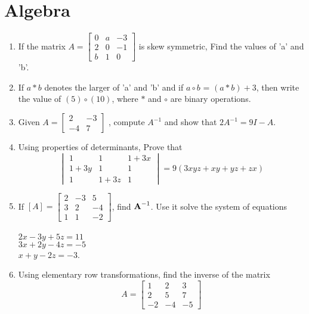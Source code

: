 \documentclass{article}
\newcommand{\mydet}[1]{\ensuremath{\begin{vmatrix}#1\end{vmatrix}}}
\providecommand{\sbrak}[1]{\ensuremath{{}\left[#1\right]}}
\providecommand{\brak}[1]{\ensuremath{\left(#1\right)}}
\begin{document}
\section{Algebra}
\begin{enumerate}
 \item If the matrix $ A=\begin{bmatrix}
		0 & a & -3\\
		2 & 0 & -1\\
		b & 1 & 0
                \end{bmatrix}$ is skew symmetric, Find the values of 'a' and 'b'.
\item If $a \ast b$ denotes the larger of 'a' and 'b' and if $a \circ b$ = $ \brak{a \ast b}+ 3$, then write the value of $ \brak{5} \circ \brak{10} $, where $\ast$ and $\circ$ are binary operations.  
\item Given $ A = \begin{bmatrix}
		2 & -3\\
		-4 & 7
\end{bmatrix}$ , compute $A^{-1}$ and show that $2A^{-1}=9I - A$.
\item Using properties of determinants, Prove that \[ \mydet{
		1 & 1 & 1+3x \\
		1+3y & 1 & 1 \\
		1 & 1+3z & 1}
	=9\brak{3xyz+xy+yz+zx}\]
\item If $\sbrak A=\begin{bmatrix}
		2 & -3 & 5 \\
		3 & 2 & -4 \\
		1 & 1 & -2
\end{bmatrix}$, find $\textbf A^{-1}$. Use it solve the system of equations\\
\\
$2x-3y+5z=11$\\
$3x+2y-4z=-5$\\
$x+y-2z=-3$.
\item Using elementary row transformations, find the inverse of the matrix 
	\[  A=\begin{bmatrix}
		1 & 2 & 3\\
		2 & 5 & 7\\
		-2 & -4 & -5
	\end{bmatrix}\]
\end{enumerate}
\end{document}
